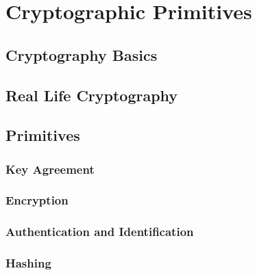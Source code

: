 
\chapter{Cryptographic Primitives} %
\label{Chapter3}


\section{Cryptography Basics}
\section{Real Life Cryptography}
\section{Primitives}
\subsection{Key Agreement}
\subsection{Encryption}
\subsection{Authentication and Identification}
\subsection{Hashing}